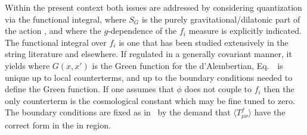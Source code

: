 
Within the present context both issues are addressed by considering
quantization via the functional integral,
%
\eqn{}
%
where $S_G$ is the purely gravitational/dilatonic part of the action \one,
and where the $g$-dependence of the $f_i$ measure is explicitly indicated.
The functional integral over $f_i$ is one that has been studied extensively
in the string literature and elsewhere.  If regulated in a generally
covariant manner, it yields
%
\eqn{}
%
where $G(x,x')$ is the Green function for the d'Alembertian,
%
\eqn{}
%
Eq.~\fint\ is unique up to local counterterms, and up to the boundary
conditions needed to define the Green function. If one assumes that $\phi$ does
not couple to $f_i$ then the only counterterm is the
cosmological constant which may be fine tuned to  zero.  The boundary
conditions are fixed as in \CGHS\ by the demand that $\langle
T_{\mu\nu}^f\rangle$ have
the correct form in the in region.

